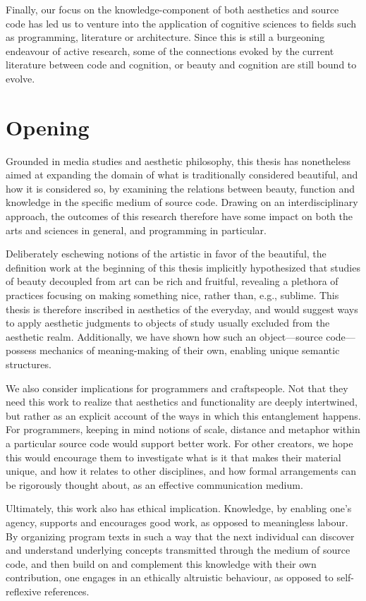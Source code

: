 Finally, our focus on the knowledge-component of both aesthetics and source code has led us to venture into the application of cognitive sciences to fields such as programming, literature or architecture. Since this is still a burgeoning endeavour of active research,  some of the connections evoked by the current literature between code and cognition, or beauty and cognition are still bound to evolve.

\section{Opening}
\label{sec:opening}

Grounded in media studies and aesthetic philosophy, this thesis has nonetheless aimed at expanding the domain of what is traditionally considered beautiful, and how it is considered so, by examining the relations between beauty, function and knowledge in the specific medium of source code. Drawing on an interdisciplinary approach, the outcomes of this research therefore have some impact  on both the arts and sciences in general, and programming in particular.

Deliberately eschewing notions of the artistic in favor of the beautiful, the definition work at the beginning of this thesis implicitly hypothesized that studies of beauty decoupled from art can be rich and fruitful, revealing a plethora of practices focusing on making something nice, rather than, e.g., sublime. This thesis is therefore inscribed in aesthetics of the everyday, and would suggest ways to apply aesthetic judgments to objects of study usually excluded from the aesthetic realm. Additionally, we have shown how such an object—source code—possess mechanics of meaning-making of their own, enabling unique semantic structures.

We also consider implications for programmers and craftspeople. Not that they need this work to realize that aesthetics and functionality are deeply intertwined, but rather as an explicit account of the ways in which this entanglement happens. For programmers, keeping in mind notions of scale, distance and metaphor within a particular source code would support better work. For other creators, we hope this would encourage them to investigate what is it that makes their material unique, and how it relates to other disciplines, and how formal arrangements  can be rigorously thought about, as an effective communication medium.

Ultimately, this work also has ethical implication. Knowledge, by enabling one's agency, supports and encourages good work, as opposed to meaningless labour. By organizing program texts in such a way that the next individual can discover and understand underlying concepts transmitted through the medium of source code, and then build on and complement this knowledge with their own contribution, one engages in an ethically altruistic behaviour, as opposed to self-reflexive references.

